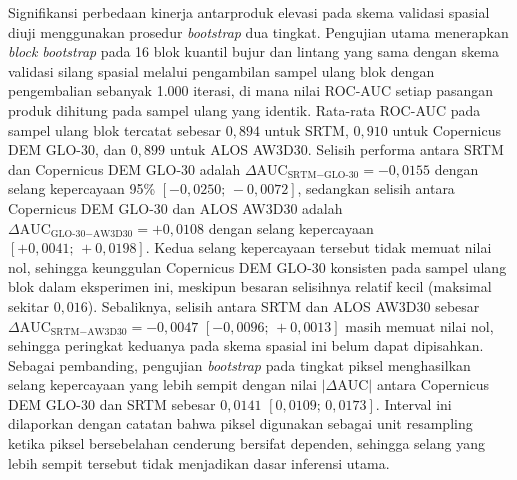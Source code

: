 \documentclass[12pt]{article}
\begin{document}
Signifikansi perbedaan kinerja antarproduk elevasi pada skema validasi spasial
diuji menggunakan prosedur \textit{bootstrap} dua tingkat. Pengujian utama
menerapkan \textit{block bootstrap} pada 16 blok kuantil bujur dan lintang
yang sama dengan skema validasi silang spasial melalui pengambilan sampel
ulang blok dengan pengembalian sebanyak 1.000 iterasi, di mana nilai ROC-AUC
setiap pasangan produk dihitung pada sampel ulang yang identik. Rata-rata
ROC-AUC pada sampel ulang blok tercatat sebesar $0{,}894$ untuk SRTM,
$0{,}910$ untuk Copernicus DEM GLO-30, dan $0{,}899$ untuk ALOS AW3D30.
Selisih performa antara SRTM dan Copernicus DEM GLO-30 adalah
$\Delta\text{AUC}_{\text{SRTM}-\text{GLO-30}} = -0{,}0155$ dengan selang
kepercayaan 95\% $[-0{,}0250;\,-0{,}0072]$, sedangkan selisih antara
Copernicus DEM GLO-30 dan ALOS AW3D30 adalah
$\Delta\text{AUC}_{\text{GLO-30}-\text{AW3D30}} = +0{,}0108$ dengan selang
kepercayaan $[+0{,}0041;\,+0{,}0198]$. Kedua selang kepercayaan tersebut tidak
memuat nilai nol, sehingga keunggulan Copernicus DEM GLO-30 konsisten pada
sampel ulang blok dalam eksperimen ini, meskipun besaran selisihnya relatif
kecil (maksimal sekitar $0{,}016$). Sebaliknya, selisih antara SRTM dan ALOS
AW3D30 sebesar $\Delta\text{AUC}_{\text{SRTM}-\text{AW3D30}} = -0{,}0047$
$[-0{,}0096;\,+0{,}0013]$ masih memuat nilai nol, sehingga peringkat keduanya
pada skema spasial ini belum dapat dipisahkan. Sebagai pembanding, pengujian
\textit{bootstrap} pada tingkat piksel menghasilkan selang kepercayaan yang
lebih sempit dengan nilai $|\Delta\text{AUC}|$ antara Copernicus DEM GLO-30
dan SRTM sebesar $0{,}0141$ $[0{,}0109;\,0{,}0173]$. Interval ini dilaporkan
dengan catatan bahwa piksel digunakan sebagai unit resampling ketika piksel
bersebelahan cenderung bersifat dependen, sehingga selang yang lebih sempit
tersebut tidak menjadikan dasar inferensi utama.
\end{document}
